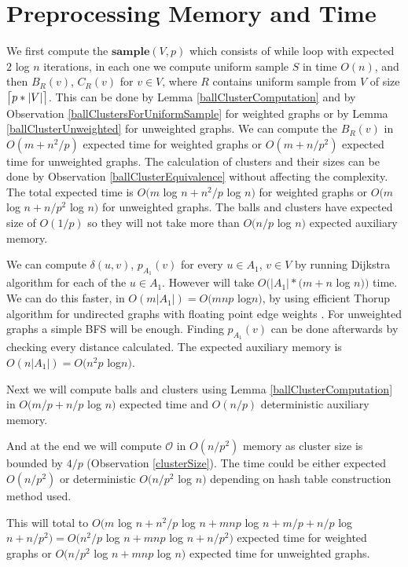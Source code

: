 \documentclass[shortabstract, lic, english]{iithesis}
\theoremstyle{definition} \newtheorem{definition}{Definition}[chapter]
\theoremstyle{remark} \newtheorem{remark}[definition]{Observation}
\theoremstyle{plain} \newtheorem{theorem}[definition]{Theorem}
\theoremstyle{plain} \newtheorem{lemma}[definition]{Lemma}
\theoremstyle{plain} \newtheorem{conjecture}[definition]{Conjecture}
\DeclarePairedDelimiter{\ceil}{\lceil}{\rceil}
\begin{document}
\section{Preprocessing Memory and Time}

We first compute the $\mathbf{sample}(V, p)$ which consists of while loop with expected $2$ log $n$ iterations,
in each one we compute uniform sample $S$ in time $O(n)$, and then $B_R(v)$, $C_R(v)$ for $v \in V$, where $R$ contains uniform sample from $V$ of size $\ceil[\big]{p * |V|}$.
This can be done by Lemma \ref{ballClusterComputation} and by Observation \ref{ballClustersForUniformSample} for weighted graphs or by Lemma \ref{ballClusterUnweighted} for unweighted graphs.
We can compute the $B_R(v)$ in $O(m + n^2/p)$ expected time for weighted graphs or $O(m + n/p^2)$ expected time for unweighted graphs.
The calculation of clusters and their sizes can be done by Observation \ref{ballClusterEquivalence} without affecting the complexity.
The total expected time is $O(m $ log $ n + n^2/p $ log $ n)$ for weighted graphs or $O(m $ log $ n + n/p^2 $ log $ n)$ for unweighted graphs.
The balls and clusters have expected size of $O(1/p)$ so they will not take more than $O(n/p $ log $ n)$ expected auxiliary memory.

We can compute $\delta(u,v)$, $p_{A_1}(v)$ for every $u \in A_1$, $v \in V$ by running Dijkstra algorithm for each of the $u \in A_1$.
However will take $O(|A_1| *(m + n$ log $ n))$ time.
We can do this faster, in $O(m|A_1|) = O(mnp$ log$ n)$, by using efficient Thorup algorithm for undirected graphs with floating point edge weights \cite{uberDijkstraInt}\cite{uberDijkstraFloat}.
For unweighted graphs a simple BFS will be enough.
Finding $p_{A_1}(v)$ can be done afterwards by checking every distance calculated.
The expected auxiliary memory is $O(n|A_1|) = O(n^2p$ log$ n)$.

Next we will compute balls and clusters using Lemma \ref{ballClusterComputation} in $O(m/p + n/p $ log $ n)$ expected time and $O(n/p)$ deterministic auxiliary memory.

And at the end we will compute $\mathcal{O}$ in $O(n/p^2)$ memory as cluster size is bounded by $4/p$ (Observation \ref{clusterSize}).
The time could be either expected $O(n/p^2)$ or deterministic $O(n/p^2 $ log $ n)$ depending on hash table construction method used.

This will total to $O(m $ log $ n + n^2/p $ log $ n + mnp$ log $ n + m/p + n/p $ log $ n + n/p^2) = O(n^2/p $ log $ n + mnp$ log $ n + n/p^2)$ expected time for weighted graphs
or $O(n/p^2 $ log $n + mnp $ log $n)$ expected time for unweighted graphs.
\end{document}
